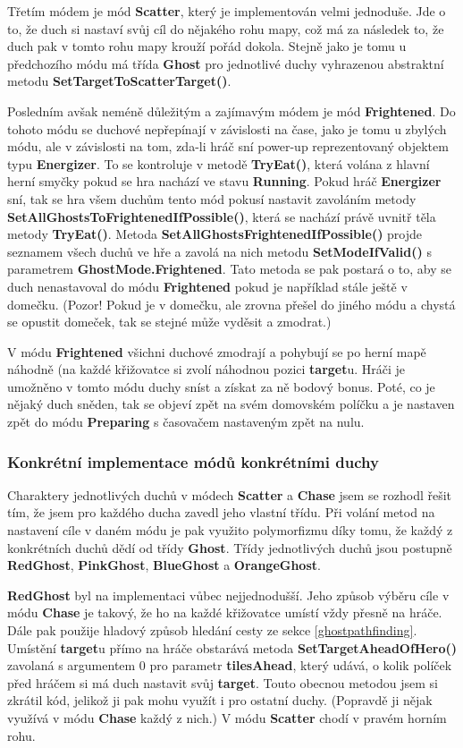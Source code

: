 \documentclass[a4]{article}
\begin{document}
Třetím módem je mód \textbf{Scatter}, který je implementován velmi jednoduše. Jde o to, že duch si nastaví svůj cíl do nějakého rohu mapy, což má za následek to, že duch pak v tomto rohu mapy krouží pořád dokola. Stejně jako je tomu u předchozího módu má třída \textbf{Ghost} pro jednotlivé duchy vyhrazenou abstraktní metodu \textbf{SetTargetToScatterTarget()}.

Posledním avšak neméně důležitým a zajímavým módem je mód \textbf{Frightened}. Do tohoto módu se duchové nepřepínají v závislosti na čase, jako je tomu u zbylých módu, ale v závislosti na tom, zda-li hráč sní power-up reprezentovaný objektem typu \textbf{Energizer}. To se kontroluje v metodě \textbf{TryEat()}, která volána z hlavní herní smyčky pokud se hra nachází ve stavu \textbf{Running}. Pokud hráč \textbf{Energizer} sní, tak se hra všem duchům tento mód pokusí nastavit zavoláním metody \textbf{SetAllGhostsToFrightenedIfPossible()}, která se nachází právě uvnitř těla metody \textbf{TryEat()}. Metoda \textbf{SetAllGhostsFrightenedIfPossible()} projde seznamem všech duchů ve hře a zavolá na nich metodu \textbf{SetModeIfValid()} s parametrem \textbf{GhostMode.Frightened}. Tato metoda se pak postará o to, aby se duch nenastavoval do módu \textbf{Frightened} pokud je například stále ještě v domečku. (Pozor! Pokud je v domečku, ale zrovna přešel do jiného módu a chystá se opustit domeček, tak se stejné může vyděsit a zmodrat.)

V módu \textbf{Frightened} všichni duchové zmodrají a pohybují se po herní mapě náhodně (na každé křižovatce si zvolí náhodnou pozici \textbf{target}u. Hráči je umožněno v tomto módu duchy sníst a získat za ně bodový bonus. Poté, co je nějaký duch sněden, tak se objeví zpět na svém domovském políčku a je nastaven zpět do módu \textbf{Preparing} s časovačem nastaveným zpět na nulu.
\subsubsection{Konkrétní implementace módů konkrétními duchy} \label{concretemodes}
Charaktery jednotlivých duchů v módech \textbf{Scatter} a \textbf{Chase} jsem se rozhodl řešit tím, že jsem pro každého ducha zavedl jeho vlastní třídu. Při volání metod na nastavení cíle v daném módu je pak využito polymorfizmu díky tomu, že každý z konkrétních duchů dědí od třídy \textbf{Ghost}. Třídy jednotlivých duchů jsou postupně \textbf{RedGhost}, \textbf{PinkGhost}, \textbf{BlueGhost} a \textbf{OrangeGhost}. 

\textbf{RedGhost} byl na implementaci vůbec nejjednodušší. Jeho způsob výběru cíle v módu \textbf{Chase} je takový, že ho na každé křižovatce umístí vždy přesně na hráče. Dále pak použije hladový způsob hledání cesty ze sekce \ref{ghostpathfinding}. Umístění \textbf{target}u přímo na hráče obstarává metoda \textbf{SetTargetAheadOfHero()} zavolaná s argumentem 0 pro parametr \textbf{tilesAhead}, který udává, o kolik políček před hráčem si má duch nastavit svůj \textbf{target}. Touto obecnou metodou jsem si zkrátil kód, jelikož ji pak mohu využít i pro ostatní duchy. (Popravdě ji nějak využívá v módu \textbf{Chase} každý z nich.) V módu \textbf{Scatter} chodí v pravém horním rohu.
\end{document}
